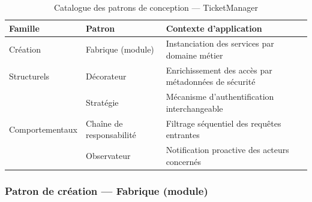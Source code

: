 \begin{table}[H]

\centering

\footnotesize

\renewcommand{\arraystretch}{1.2}

\setlength{\tabcolsep}{6pt}

\begin{tabular}{|p{3.2cm}|p{4.2cm}|p{5.8cm}|}

\hline

\textbf{Famille} & \textbf{Patron} & \textbf{Contexte d'application} \\

\hline

Création & Fabrique (module) & Instanciation des services par domaine métier \\

\hline

Structurels & Décorateur & Enrichissement des accès par métadonnées de sécurité \\

\hline

\multirow{3}{*}{Comportementaux} & Stratégie & Mécanisme d'authentification interchangeable \\

\cline{2-3}

 & Chaîne de responsabilité & Filtrage séquentiel des requêtes entrantes \\

\cline{2-3}

 & Observateur & Notification proactive des acteurs concernés \\

\hline

\end{tabular}

\caption{Catalogue des patrons de conception — TicketManager}

\label{tab:catalogue-patrons}

\end{table}






\subsubsection{Patron de création — Fabrique (module)}

